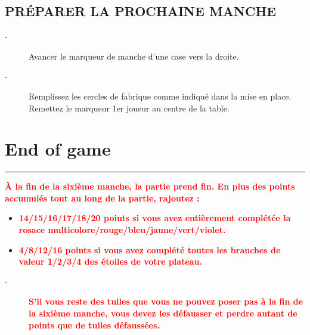 \documentclass{scrartcl}%
\begin{document}
%
\subsection{ PRÉPARER LA PROCHAINE MANCHE
}%
\label{subsec:PRPARERLAPROCHAINEMANCHE}%
\begin{description}%
\item[{-} ]%
%
 Avancer le marqueur de manche d'une case vers la droite.
%
\item[{-} ]%
%
 Remplissez les cercles de fabrique comme indiqué dans la mise en place. Remettez le marqueur 1er joueur au centre de la table.
%
\end{description}

%
\sectionfont{\color{red}}%
\subsectionfont{\color{red}}%
\subsubsectionfont{\color{red}}%
\section{ End of game
}%
\label{sec:Endofgame}%
\textcolor{red}{\rule{18cm}{0.07cm}}\break%
\textcolor{red}{%
\textbf{À la fin de la sixième manche, la partie prend fin. En plus des points accumulés tout au long de la partie, rajoutez :}%
}%

%
\begin{itemize}%
\item%
%
\textcolor{red}{%
\textbf{14/15/16/17/18/20 points si vous avez entièrement complétée la rosace multicolore/rouge/bleu/jaune/vert/violet.}%
}%

%
\item%
%
\textcolor{red}{%
\textbf{4/8/12/16 points si vous avez complété toutes les branches de valeur 1/2/3/4 des étoiles de votre plateau.}%
}%

%
\end{itemize}%
\begin{description}%
\item[{-} ]%
%
\textcolor{red}{%
\textbf{S'il vous reste des tuiles que vous ne pouvez poser pas à la fin de la sixième manche, vous devez les défausser et perdre autant de points que de tuiles défaussées.}%
}%
\end{description}

%
\end{document}

